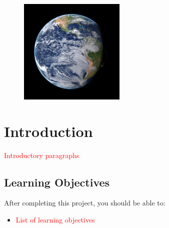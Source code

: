 




\noindent {}

\quad

\begin{figure}[h]
	\centering
	\includegraphics[width=0.45\textwidth]{figures/earth.jpg}
\end{figure}

\section*{Introduction}

\thispagestyle{fancy} %

\textcolor{red}{Introductory paragraphs}

\subsection*{Learning Objectives}

After completing this project, you should be able to:
\begin{itemize}
	\item \textcolor{red}{List of learning objectives}
\end{itemize}

